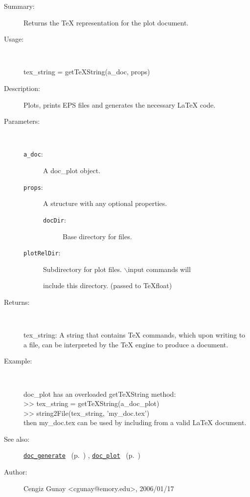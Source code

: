 \begin{description}
\item[Summary:]Returns the TeX representation for the plot document.
%
\item[Usage:]~%
\begin{lyxcode}%
tex\_string = getTeXString(a\_doc, props)
%
\end{lyxcode}%
%
\item[Description:]%
Plots, prints EPS files and generates the necessary LaTeX code.
\item[Parameters:]~
\begin{description}%
\item[\texttt{a\_doc}:]
 A doc\_plot object.
\item[\texttt{props}:]
 A structure with any optional properties.
\begin{description}%
\item[\texttt{docDir}:]
 Base directory for files.
\end{description}%
\item[\texttt{plotRelDir}:]
 Subdirectory for plot files. $\backslash$input commands will

include this directory.
(passed to TeXfloat)
\end{description}%
%
\item[Returns:
]~

	tex\_string: A string that contains TeX commands, which upon writing to a file,
	  can be interpreted by the TeX engine to produce a document.
%
\item[Example:]~
\begin{lyxcode}        doc\_plot has an overloaded getTeXString method:
\\%
        >> tex\_string = getTeXString(a\_doc\_plot)
\\%
        >> string2File(tex\_string, 'my\_doc.tex')
\\%
        then my\_doc.tex can be used by including from a valid LaTeX document.
\\%
\end{lyxcode}
%
\item[See also:]%
\hyperlink{ref_doc_generate}{\texttt{doc\_generate}}%
\ (p.~\pageref{ref_doc_generate})%
%
, \hyperlink{ref_doc_plot}{\texttt{doc\_plot}}%
\ (p.~\pageref{ref_doc_plot})%
%
%
\item[Author:]%
Cengiz Gunay <cgunay@emory.edu>, 2006/01/17
%
\end{description}
\methodline%
